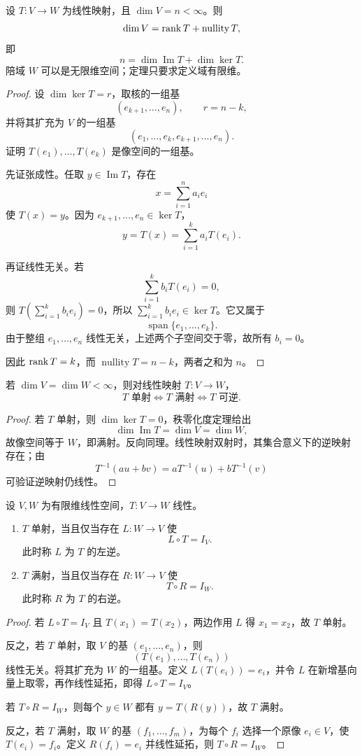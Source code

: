 \begin{theorem}[秩零化度定理]
设 $T:V\to W$ 为线性映射，且 $\dim V=n<\infty$。则
\[
\dim V=\operatorname{rank} T+\operatorname{nullity}T,
\]
即
\[
n=\dim\operatorname{Im}T+\dim\ker T.
\]
陪域 $W$ 可以是无限维空间；定理只要求定义域有限维。
\end{theorem}
\begin{proof}
设 $\dim\ker T=r$，取核的一组基
\[
(e_{k+1},\ldots,e_n),\qquad r=n-k,
\]
并将其扩充为 $V$ 的一组基
\[
(e_1,\ldots,e_k,e_{k+1},\ldots,e_n).
\]
证明 $T(e_1),\ldots,T(e_k)$ 是像空间的一组基。

先证张成性。任取 $y\in\operatorname{Im}T$，存在
\[
x=\sum_{i=1}^n a_ie_i
\]
使 $T(x)=y$。因为 $e_{k+1},\ldots,e_n\in\ker T$，
\[
y=T(x)=\sum_{i=1}^k a_iT(e_i).
\]

再证线性无关。若
\[
\sum_{i=1}^k b_iT(e_i)=0,
\]
则 $T(\sum_{i=1}^k b_ie_i)=0$，所以 $\sum_{i=1}^k b_ie_i\in\ker T$。它又属于
\[
\operatorname{span}\{e_1,\ldots,e_k\}.
\]
由于整组 $e_1,\ldots,e_n$ 线性无关，上述两个子空间交于零，故所有 $b_i=0$。

因此 $\operatorname{rank} T=k$，而 $\operatorname{nullity}T=n-k$，两者之和为 $n$。
\end{proof}

\begin{corollary}[有限维等维空间中的单射与满射]
若 $\dim V=\dim W<\infty$，则对线性映射 $T:V\to W$，
\[
T\text{ 单射}\iff T\text{ 满射}\iff T\text{ 可逆}.
\]
\end{corollary}
\begin{proof}
若 $T$ 单射，则 $\dim\ker T=0$，秩零化度定理给出
\[
\dim\operatorname{Im}T=\dim V=\dim W,
\]
故像空间等于 $W$，即满射。反向同理。线性映射双射时，其集合意义下的逆映射存在；由
\[
T^{-1}(au+bv)=aT^{-1}(u)+bT^{-1}(v)
\]
可验证逆映射仍线性。
\end{proof}

\begin{theorem}[左逆、右逆与单射满射]
设 $V,W$ 为有限维线性空间，$T:V\to W$ 线性。
\begin{enumerate}
\item $T$ 单射，当且仅当存在 $L:W\to V$ 使
\[
L\circ T=I_V.
\]
此时称 $L$ 为 $T$ 的左逆。
\item $T$ 满射，当且仅当存在 $R:W\to V$ 使
\[
T\circ R=I_W.
\]
此时称 $R$ 为 $T$ 的右逆。
\end{enumerate}
\end{theorem}
\begin{proof}
若 $L\circ T=I_V$ 且 $T(x_1)=T(x_2)$，两边作用 $L$ 得 $x_1=x_2$，故 $T$ 单射。

反之，若 $T$ 单射，取 $V$ 的基 $(e_1,\ldots,e_n)$，则
\[
(T(e_1),\ldots,T(e_n))
\]
线性无关。将其扩充为 $W$ 的一组基。定义 $L(T(e_i))=e_i$，并令 $L$ 在新增基向量上取零，再作线性延拓，即得 $L\circ T=I_V$。

若 $T\circ R=I_W$，则每个 $y\in W$ 都有 $y=T(R(y))$，故 $T$ 满射。

反之，若 $T$ 满射，取 $W$ 的基 $(f_1,\ldots,f_m)$，为每个 $f_i$ 选择一个原像 $e_i\in V$，使 $T(e_i)=f_i$。定义 $R(f_i)=e_i$ 并线性延拓，则 $T\circ R=I_W$。
\end{proof}

